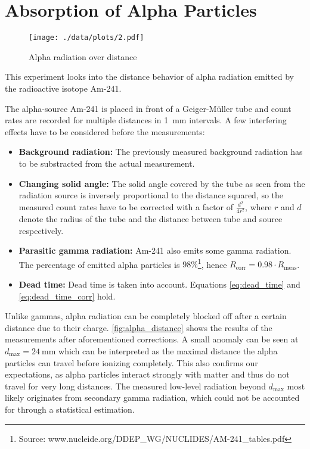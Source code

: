 \chapter{Absorption of Alpha Particles}
\begin{figure}[ht!]
	\centering
	\texttt{[image: ./data/plots/2.pdf]}
	\caption[Alpha radiation over distance]{Alpha radiation over distance}
	\label{fig:alpha_distance}
\end{figure}

This experiment looks into the distance behavior of alpha radiation emitted by the radioactive isotope Am-241.

The alpha-source Am-241 is placed in front of a Geiger-Müller tube and count rates are recorded for multiple distances in \SI{1}{\milli\meter} intervals.
A few interfering effects have to be considered before the measurements:
\begin{itemize}
	\item \textbf{Background radiation:} The previously measured background radiation has to be substracted from the actual measurement.
	\item \textbf{Changing solid angle:} The solid angle covered by the tube as seen from the radiation source is inversely proportional to the distance squared, so the measured count rates have to be corrected with a factor of $\frac{d^2}{4r^2}$, where $r$ and $d$ denote the radius of the tube and the distance between tube and source respectively.
	\item \textbf{Parasitic gamma radiation:} Am-241 also emits some gamma radiation. The percentage of emitted alpha particles is $\num{98}\%$\footnote{Source: www.nucleide.org/DDEP\_WG/NUCLIDES/AM-241\_tables.pdf}, hence $R_\text{corr}=0.98\cdot R_\text{meas}$.
	\item \textbf{Dead time:} Dead time is taken into account. Equations \ref{eq:dead_time} and \ref{eq:dead_time_corr} hold.
\end{itemize}

Unlike gammas, alpha radiation can be completely blocked off after a certain distance due to their charge.
\autoref{fig:alpha_distance} shows the results of the measurements after aforementioned corrections.
A small anomaly can be seen at $d_\text{max}=\SI{24}{\milli\meter}$ which can be interpreted as the maximal distance the alpha particles can travel before ionizing completely.
This also confirms our expectations, as alpha particles interact strongly with matter and thus do not travel for very long distances.
The measured low-level radiation beyond $d_\text{max}$ most likely originates from secondary gamma radiation, which could not be accounted for through a statistical estimation.

